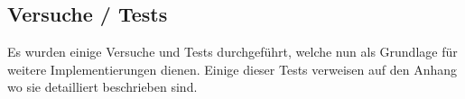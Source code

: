 \subsection{Versuche / Tests}
Es wurden einige Versuche und Tests durchgeführt, welche nun als Grundlage für weitere Implementierungen dienen. Einige dieser Tests verweisen auf den Anhang wo sie detailliert beschrieben sind.








